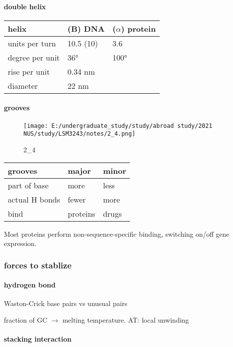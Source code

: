 \documentclass[]{article}
\let\oldparagraph\paragraph
\renewcommand{\paragraph}[1]{\oldparagraph{#1}\mbox{}}
\begin{document}
\hypertarget{double-helix}{%
\paragraph{double helix}\label{double-helix}}

\begin{longtable}[]{@{}lll@{}}
\toprule
helix & (B) DNA & (\(\alpha\)) protein\tabularnewline
\midrule
\endhead
units per turn & 10.5 (10) & 3.6\tabularnewline
degree per unit & 36° & 100°\tabularnewline
rise per unit & 0.34 nm &\tabularnewline
diameter & 22 nm &\tabularnewline
\bottomrule
\end{longtable}

\hypertarget{grooves}{%
\paragraph{grooves}\label{grooves}}

\begin{figure}
\centering
\texttt{[image: E:/undergraduate\_study/study/abroad study/2021 NUS/study/LSM3243/notes/2\_4.png]}
\caption{2\_4}
\end{figure}

\begin{longtable}[]{@{}lll@{}}
\toprule
grooves & major & minor\tabularnewline
\midrule
\endhead
part of base & more & less\tabularnewline
actual H bonds & fewer & more\tabularnewline
bind & proteins & drugs\tabularnewline
\bottomrule
\end{longtable}

Most proteins perform non-sequence-specific binding, switching on/off
gene expression.

\hypertarget{forces-to-stablize}{%
\subsubsection{forces to stablize}\label{forces-to-stablize}}

\hypertarget{hydrogen-bond-2}{%
\paragraph{hydrogen bond}\label{hydrogen-bond-2}}

Waston-Crick base pairs vs unusual pairs

fraction of GC \(\to\) melting temperature. AT: local unwinding

\hypertarget{stacking-interaction}{%
\paragraph{stacking interaction}\label{stacking-interaction}}
\end{document}
